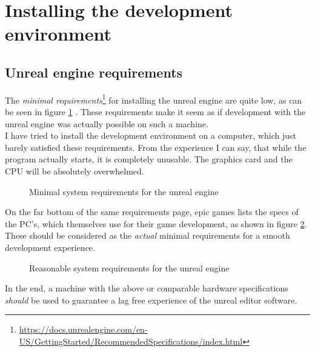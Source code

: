 \section{Installing the development environment}

\subsection{Unreal engine requirements}

The \textit{minimal requirements}\footnote{\url{https://docs.unrealengine.com/en-US/GettingStarted/RecommendedSpecifications/index.html}} for installing the unreal engine are quite low, as can be seen in figure \ref{fig:unrealminspecs} \cite{UnrealEngineSpecs}. These requirements make it seem as if development with the unreal engine was actually possible on such a machine.\\
I have tried to install the development environment on a computer, which just barely satisfied these requirements. From the experience I can say, that while the program actually starts, it is completely unusable. The graphics card and the CPU will be absolutely overwhelmed.

\setlength{\fboxsep}{0pt}
\setlength{\fboxrule}{0pt}
\begin{figure}[h]
\centering
{}
\caption[Minimal system requirements unreal engine]{Minimal system requirements for the unreal engine}
\label{fig:unrealminspecs}
\end{figure}

On the far bottom of the same requirements page, epic games lists the specs of the PC's, which themselves use for their game development, as shown in figure \ref{fig:unrealgoodspecs}.\\
These should be considered as the \textit{actual} minimal requirements for a smooth development experience.

\setlength{\fboxsep}{0pt}
\setlength{\fboxrule}{0pt}
\begin{figure}[h]
\centering
{}
\caption[Reasonable system requirements unreal engine]{Reasonable system requirements for the unreal engine}
\label{fig:unrealgoodspecs}
\end{figure}

In the end, a machine with the above or comparable hardware specifications \textit{should} be used to guarantee a lag free experience of the unreal editor software.

